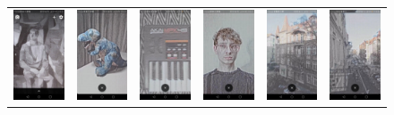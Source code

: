 \documentclass[../Main.tex]{subfiles}
\begin{document}
\begin{figure}[H]
\begin{tabular}{cccccc}
\includegraphics[width = 0.13\linewidth]{Images/app_photos/filters/draw.jpg} &
\includegraphics[width = 0.13\linewidth]{Images/app_photos/dino/draw.jpg} &
\includegraphics[width = 0.13\linewidth]{Images/app_photos/akai/draw.jpg} &
\includegraphics[width = 0.13\linewidth]{Images/app_photos/me/draw.jpg} &
\includegraphics[width = 0.13\linewidth]{Images/app_photos/kamienica/draw.jpg} &
\includegraphics[width = 0.13\linewidth]{Images/app_photos/ulica/draw.jpg} \\


\end{tabular}
\end{figure}
\end{document}
